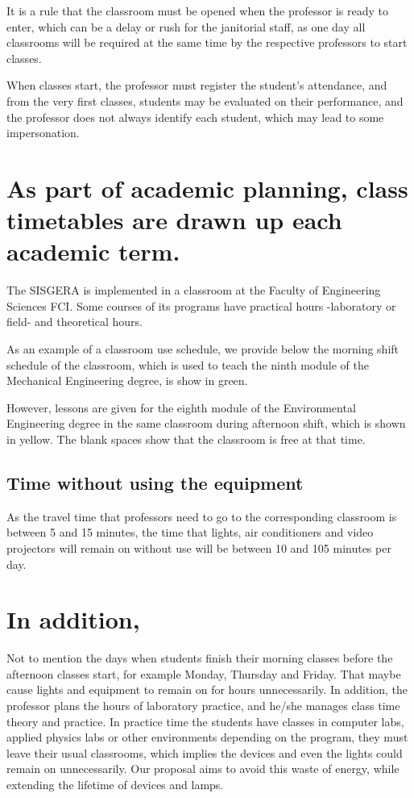 \documentclass[]{scrartcl}
\begin{document}
	It is a rule that the classroom must be opened when the professor is ready to enter, which can be a delay or rush for the janitorial staff, as one day all classrooms will be required at the same time by the respective professors to start classes.
	
	When classes start, the professor must register the student's attendance, and from the very first classes, students may be evaluated on their performance, and the professor does not always identify each student, which may lead to some impersonation.
	
\section*{As part of academic planning, class timetables are drawn up each academic term.}
	The SISGERA is implemented in a classroom at the Faculty of Engineering Sciences FCI. Some courses of its programs have practical hours -laboratory or field- and theoretical hours.
	
	As an example of a classroom use schedule, we provide below the morning shift schedule of the classroom, which is used to teach the ninth module of the Mechanical Engineering degree, is show in green.
	
	However, lessons are given for the eighth module of the Environmental Engineering degree in the same classroom during afternoon shift, which is shown in yellow.
	The blank spaces show that the classroom is free at that time.
	
	\subsection*{Time without using the equipment}
	As the travel time that professors need to go to the corresponding classroom is between 5 and 15 minutes, the time that lights, air conditioners and video projectors will remain on without use will be between 10 and 105 minutes per day.
	
\section*{In addition,}
	Not to mention the days when students finish their morning classes before the afternoon classes start, for example Monday, Thursday and Friday. That maybe cause lights and equipment to remain on for hours unnecessarily. In addition, the professor plans the hours of laboratory practice, and he/she manages class time theory and practice. In practice time the students have classes in computer labs, applied physics labs or other environments depending on the program, they must leave their usual classrooms, which implies the devices and even the lights could remain on unnecessarily. Our proposal aims to avoid this waste of energy, while extending the lifetime of devices and lamps.
\end{document}
